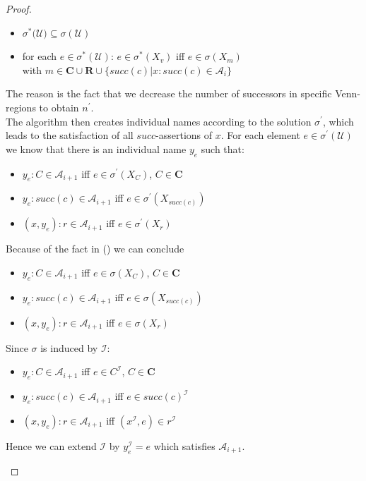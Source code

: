 \documentclass{book}
\theoremstyle{break}
\theoremstyle{definition}
\begin{document}
\begin{proof}
\begin{itemize}
\begin{itemize}
\item $\sigma^\ast(\mathcal{U)}\subseteq\sigma(\mathcal{U})$
\item for each $e\in \sigma^\ast(\mathcal{U})$: $e\in \sigma^\ast(X_v)$ iff $e\in\sigma(X_m)$\\
with $m\in\mathbf{C}\cup\mathbf{R}\cup\{succ(c)|x:succ(c)\in \mathcal{A}_i\}$
\end{itemize}
The reason is the fact that we decrease the number of successors in specific Venn-regions to obtain $n^\prime$.\\
The algorithm then creates individual names according to the solution $\sigma^\prime$, which leads to the satisfaction of all $succ$-assertions of $x$. For each element $e\in\sigma^\prime(\mathcal{U})$ we know that there is an individual name $y_e$ such that:
\begin{itemize}
\item $y_e:C\in\mathcal{A}_{i+1}$ iff $e\in\sigma^\prime(X_C)$, $C\in\mathbf{C}$
\item $y_e:succ(c)\in\mathcal{A}_{i+1}$ iff $e\in\sigma^\prime(X_{succ(c)})$
\item $(x,y_e):r\in\mathcal{A}_{i+1}$ iff $e\in\sigma^\prime(X_r)$
\end{itemize}
Because of the fact in (\dag) we can conclude
\begin{itemize}
\item $y_e:C\in\mathcal{A}_{i+1}$ iff $e\in\sigma(X_C)$, $C\in\mathbf{C}$
\item $y_e:succ(c)\in\mathcal{A}_{i+1}$ iff $e\in\sigma(X_{succ(c)})$
\item $(x,y_e):r\in\mathcal{A}_{i+1}$ iff $e\in\sigma(X_r)$
\end{itemize}
Since $\sigma$ is induced by $\mathcal{I}$:
\begin{itemize}
\item $y_e:C\in\mathcal{A}_{i+1}$ iff $e\in C^\mathcal{I}$, $C\in\mathbf{C}$
\item $y_e:succ(c)\in\mathcal{A}_{i+1}$ iff $e\in succ(c)^\mathcal{I}$
\item $(x,y_e):r\in\mathcal{A}_{i+1}$ iff $(x^\mathcal{I},e)\in r^\mathcal{I}$
\end{itemize}
Hence we can extend $\mathcal{I}$ by $y_e^\mathcal{I}=e$ which satisfies $\mathcal{A}_{i+1}$.
\end{itemize}
\end{proof}
\end{document}
